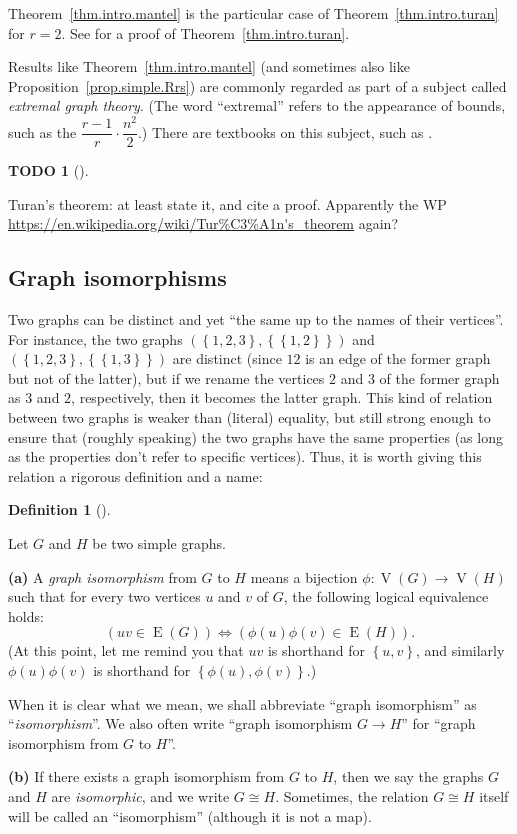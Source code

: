\documentclass[numbers=enddot,12pt,final,onecolumn,notitlepage]{scrartcl}%
\theoremstyle{definition}
\newtheorem{defi}[theo]{Definition}
\newenvironment{definition}[1][]
{\begin{defi}[#1]\begin{leftbar}}
{\end{leftbar}\end{defi}}
\newtheorem{quest}[theo]{TODO}
\newenvironment{todo}[1][]
{\begin{quest}[#1]\begin{leftbar}}
{\end{leftbar}\end{quest}}
\newcommand{\set}[1]{\left\{ #1 \right\}}
\newcommand{\tup}[1]{\left( #1 \right)}
\newcommand{\verts}[1]{\operatorname{V}\left( #1 \right)}
\newcommand{\edges}[1]{\operatorname{E}\left( #1 \right)}
\begin{document}
Theorem~\ref{thm.intro.mantel} is the particular case of
Theorem~\ref{thm.intro.turan} for $r = 2$. See
\cite[Chapter 4, Theorem 4.8]{Jukna11} for a proof of
Theorem~\ref{thm.intro.turan}.

Results like Theorem~\ref{thm.intro.mantel} (and sometimes also like
Proposition~\ref{prop.simple.Rrs}) are commonly regarded as part of
a subject called \textit{extremal graph theory}. (The word
``extremal'' refers to the appearance of bounds, such as the
$\dfrac{r-1}{r} \cdot \dfrac{n^2}{2}$.) There are textbooks on this
subject, such as \cite{Jukna11}.

\begin{todo}
Turan's theorem: at least state it, and cite a proof.
Apparently the WP
\url{https://en.wikipedia.org/wiki/Tur%C3%A1n's_theorem} again?
\end{todo}

\subsection{\label{sect.intro.iso}Graph isomorphisms}

Two graphs can be distinct and yet ``the same up to the names of their
vertices''. For instance, the two graphs
$\tup{\set{1,2,3},\set{\set{1,2}}}$ and
$\tup{\set{1,2,3},\set{\set{1,3}}}$ are distinct (since $12$ is an
edge of the former graph but not of the latter), but if we rename the
vertices $2$ and $3$ of the former graph as $3$ and $2$, respectively,
then it becomes the latter graph. This kind of relation between two
graphs is weaker than (literal) equality, but still strong enough to
ensure that (roughly speaking) the two graphs have the same properties
(as long as the properties don't refer to specific vertices). Thus,
it is worth giving this relation a rigorous definition and a name:

\begin{definition} \label{def.intro.iso}
Let $G$ and $H$ be two simple graphs.

\textbf{(a)} A \textit{graph isomorphism} from $G$ to $H$ means a
bijection $\phi : \verts{G} \to \verts{H}$ such that for every two
vertices $u$ and $v$ of $G$, the following logical equivalence holds:
\begin{equation}
\left( uv \in \edges{G} \right)
\Longleftrightarrow
\left( \phi\tup{u}\phi\tup{v} \in \edges{H} \right) .
\label{eq.def.intro.iso.a.eq}
\end{equation}
(At this point, let me remind you that $uv$ is shorthand for
$\set{u,v}$, and similarly $\phi\tup{u}\phi\tup{v}$ is shorthand for
$\set{\phi\tup{u},\phi\tup{v}}$.)

When it is clear what we mean, we shall abbreviate
``graph isomorphism'' as ``\textit{isomorphism}''. We also often write
``graph isomorphism $G \to H$'' for ``graph isomorphism from $G$ to
$H$''.

\textbf{(b)} If there exists a graph isomorphism from $G$ to $H$, then
we say the graphs $G$ and $H$ are \textit{isomorphic}, and
we write $G \cong H$. Sometimes, the relation $G \cong H$ itself will
be called an ``isomorphism'' (although it is not a map).
\end{definition}
\end{document}
